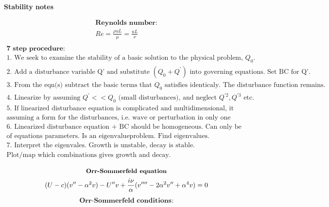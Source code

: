 \documentclass[10pt, a4paper]{article}
\begin{document}
\begin{center}
    \Large
    \textbf{Stability notes}
    \vspace{0.5cm}
\end{center}
\begin{multicols*}{2}
    \begin{gather*}
        \textbf{Reynolds number:} \\
        Re = \frac{\rho u L}{\mu} = \frac{u L}{\nu}\\
    \end{gather*}
    \begin{gather*}
        \textbf{7 step procedure:} \\
        \text{1. We seek to examine the stability of a basic solution to the physical problem, $Q_{0}$.} \\
        \text{2. Add a disturbance variable Q' and substitute $(Q_{0} + Q^{'})$ into governing equations. Set BC for Q'.} \\
        \text{3. From the eqn(s) subtract the basic terms that $Q_{0}$ satisfies identicaly. The disturbance function remains.} \\
        \text{4. Linearize by assuming $Q^{'} << Q_{0}$ (small disturbances), and neglect $Q^{'2}, Q^{'3}$ etc.} \\
        \text{5. If linearized disturbance equation is complicated and multidimensional, it can be simplyfied by } \\
        \text{assuming a form for the disturbances, i.e. wave or perturbation in only one direction.} \\
        \text{6. Linearized disturbance equation + BC should be homogeneous. Can only be solved for certain specific values }\\
        \text{of equations parameters. Is an eigenvalueproblem. Find eigenvalues.}\\
        \text{7. Interpret the eigenvales. Growth is unstable, decay is stable.} \\
        \text{Plot/map which combinations gives growth and decay.}\\
    \end{gather*}
    \begin{gather*}
        \textbf{\small Orr-Sommerfeld equation} \\
        (U - c)(v''-\alpha^2 v) - U''v + \frac{i\nu}{\alpha}(v''''-2\alpha^2v''+\alpha^4v) = 0
    \end{gather*}
    \begin{gather*}
        \textbf{Orr-Sommerfeld conditions:} \\

\end{gather*}
\end{multicols*}
\end{document}
